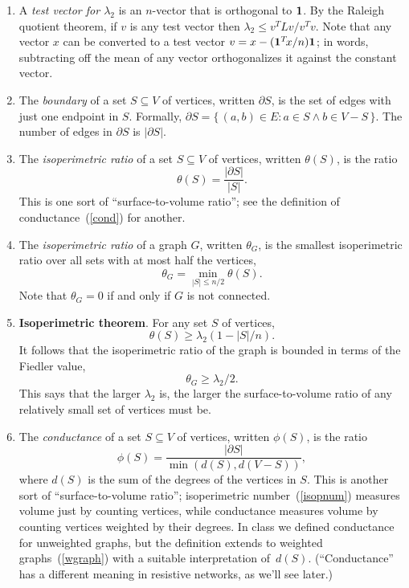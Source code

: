 \documentclass[11pt]{article}
\newcommand{\m}[1]{{\bf{#1}}}       %
\newcommand{\ones}{\m1}             %
\begin{document}
\begin{enumerate}
\item
A {\em test vector for $\lambda_2$} is an $n$-vector that is
orthogonal to $\ones$.  By the Raleigh quotient theorem,
if $v$ is any test vector then $\lambda_2 \leq v^TLv/v^Tv$.
Note that any vector $x$ can be converted to a test vector 
$v = x - (\ones^T\!x/n) \ones$; in words, subtracting off
the mean of any vector orthogonalizes it against the constant
vector.

\item
The {\em boundary} of a set $S\subseteq V$ of vertices, written $\partial S$,
is the set of edges with just one endpoint in $S$. Formally,
$\partial S = \{\,(a,b)\in E : a \in S \wedge b \in V-S\,\}$.
The number of edges in $\partial S$ is $|\partial S|$.

\item\label{isop}
The {\em isoperimetric ratio} of a set $S\subseteq V$ of vertices,
written $\theta(S)$, is the ratio
$$\theta(S) = \frac{|\partial S|}{|S|}.$$
This is one sort of ``surface-to-volume ratio''; 
see the definition of conductance~(\ref{cond}) 
for another.

\item\label{isopnum}
The {\em isoperimetric ratio} of a graph $G$,
written $\theta_G$, is the smallest isoperimetric ratio over all 
sets with at most half the vertices,
$$\theta_G = \min_{|S|\leq n/2}\theta(S).$$
Note that $\theta_G=0$ if and only if $G$ is not connected.

\item\label{isopthm} {\bf Isoperimetric theorem}.
For any set $S$ of vertices, 
$$\theta(S) \geq \lambda_2(1-|S|/n).$$
It follows that the isoperimetric ratio of the graph is bounded 
in terms of the Fiedler value,
$$\theta_G \geq \lambda_2/2.$$
This says that the larger $\lambda_2$ is, the larger the surface-to-volume
ratio of any relatively small set of vertices must be.

\item\label{cond}
The {\em conductance} of a set $S\subseteq V$ of vertices,
written $\phi(S)$, is the ratio 
$$\phi(S) = \frac{|\partial S|}{\min(d(S),d(V-S))},$$
where $d(S)$ is the sum of the degrees of the vertices in $S$.
This is another sort of ``surface-to-volume ratio'';
isoperimetric number~(\ref{isopnum}) measures volume just by counting vertices, 
while conductance measures volume by counting vertices weighted by their degrees.
In class we defined conductance for unweighted graphs,
but the definition extends to weighted graphs~(\ref{wgraph}) with
a suitable interpretation of~$d(S)$.
(``Conductance'' has a different meaning in resistive networks, as we'll see later.)


\end{enumerate}
\end{document}
